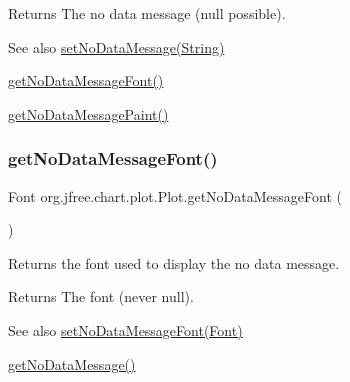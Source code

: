 \begin{DoxyReturn}{Returns}
The \textquotesingle{}no data\textquotesingle{} message ({\ttfamily null} possible).
\end{DoxyReturn}
\begin{DoxySeeAlso}{See also}
\mbox{\hyperlink{classorg_1_1jfree_1_1chart_1_1plot_1_1_plot_aee0433130592a26f29833dd91a3bc7a1}{set\+No\+Data\+Message(\+String)}} 

\mbox{\hyperlink{classorg_1_1jfree_1_1chart_1_1plot_1_1_plot_a6134fc2403602286e07e6773f963c6f6}{get\+No\+Data\+Message\+Font()}} 

\mbox{\hyperlink{classorg_1_1jfree_1_1chart_1_1plot_1_1_plot_a0fc5a1f4190e5a464857145a7ad15286}{get\+No\+Data\+Message\+Paint()}} 
\end{DoxySeeAlso}
\mbox{\label{classorg_1_1jfree_1_1chart_1_1plot_1_1_plot_a6134fc2403602286e07e6773f963c6f6}} 
\subsubsection{\texorpdfstring{get\+No\+Data\+Message\+Font()}{getNoDataMessageFont()}}
{\footnotesize\ttfamily Font org.\+jfree.\+chart.\+plot.\+Plot.\+get\+No\+Data\+Message\+Font (\begin{DoxyParamCaption}{ }\end{DoxyParamCaption})}

Returns the font used to display the \textquotesingle{}no data\textquotesingle{} message.

\begin{DoxyReturn}{Returns}
The font (never {\ttfamily null}).
\end{DoxyReturn}
\begin{DoxySeeAlso}{See also}
\mbox{\hyperlink{classorg_1_1jfree_1_1chart_1_1plot_1_1_plot_ac65a69bf34be07947529f145f8ede35e}{set\+No\+Data\+Message\+Font(\+Font)}} 

\mbox{\hyperlink{classorg_1_1jfree_1_1chart_1_1plot_1_1_plot_a6a121d914481157af8e29f372ff130eb}{get\+No\+Data\+Message()}} 
\end{DoxySeeAlso}
\mbox{\label{classorg_1_1jfree_1_1chart_1_1plot_1_1_plot_a0fc5a1f4190e5a464857145a7ad15286}} 
